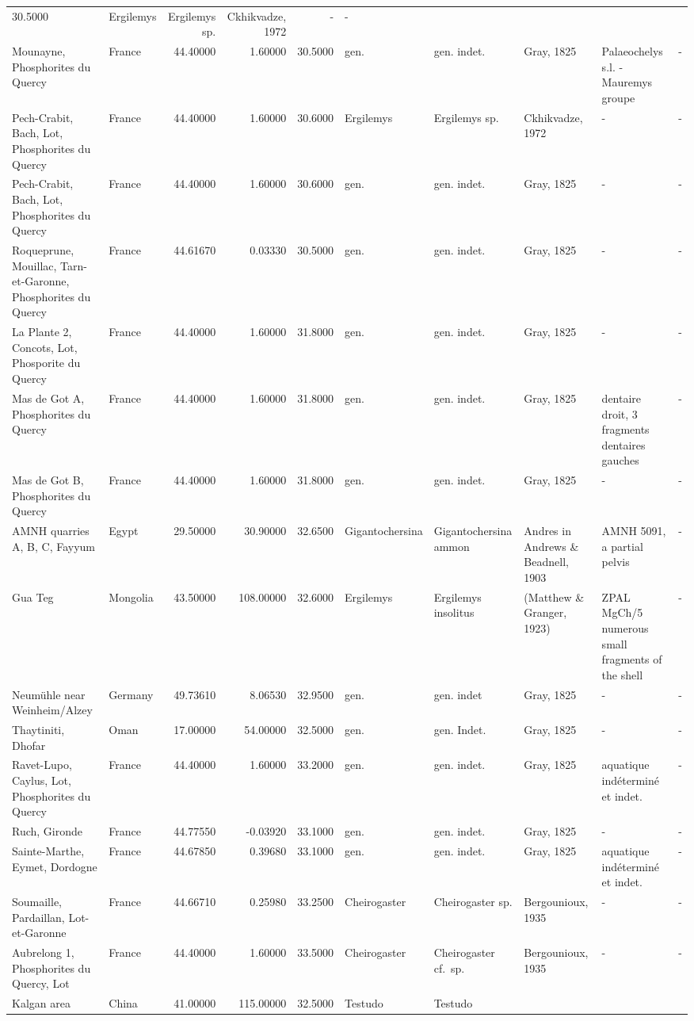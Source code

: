 \documentclass[]{article}
\begin{document}
\begin{longtable}[]{@{}llrrrlllll@{}}
30.5000 & Ergilemys & Ergilemys sp. & Ckhikvadze, 1972 & - &
-\tabularnewline
Mounayne, Phosphorites du Quercy & France & 44.40000 & 1.60000 & 30.5000
& gen. & gen. indet. & Gray, 1825 & Palaeochelys s.l. - Mauremys groupe
& -\tabularnewline
Pech-Crabit, Bach, Lot, Phosphorites du Quercy & France & 44.40000 &
1.60000 & 30.6000 & Ergilemys & Ergilemys sp. & Ckhikvadze, 1972 & - &
-\tabularnewline
Pech-Crabit, Bach, Lot, Phosphorites du Quercy & France & 44.40000 &
1.60000 & 30.6000 & gen. & gen. indet. & Gray, 1825 & - &
-\tabularnewline
Roqueprune, Mouillac, Tarn-et-Garonne, Phosphorites du Quercy & France &
44.61670 & 0.03330 & 30.5000 & gen. & gen. indet. & Gray, 1825 & - &
-\tabularnewline
La Plante 2, Concots, Lot, Phosporite du Quercy & France & 44.40000 &
1.60000 & 31.8000 & gen. & gen. indet. & Gray, 1825 & - &
-\tabularnewline
Mas de Got A, Phosphorites du Quercy & France & 44.40000 & 1.60000 &
31.8000 & gen. & gen. indet. & Gray, 1825 & dentaire droit, 3 fragments
dentaires gauches & -\tabularnewline
Mas de Got B, Phosphorites du Quercy & France & 44.40000 & 1.60000 &
31.8000 & gen. & gen. indet. & Gray, 1825 & - & -\tabularnewline
AMNH quarries A, B, C, Fayyum & Egypt & 29.50000 & 30.90000 & 32.6500 &
Gigantochersina & Gigantochersina ammon & Andres in Andrews \& Beadnell,
1903 & AMNH 5091, a partial pelvis & -\tabularnewline
Gua Teg & Mongolia & 43.50000 & 108.00000 & 32.6000 & Ergilemys &
Ergilemys insolitus & (Matthew \& Granger, 1923) & ZPAL MgCh/5 numerous
small fragments of the shell & -\tabularnewline
Neumühle near Weinheim/Alzey & Germany & 49.73610 & 8.06530 & 32.9500 &
gen. & gen. indet & Gray, 1825 & - & -\tabularnewline
Thaytiniti, Dhofar & Oman & 17.00000 & 54.00000 & 32.5000 & gen. & gen.
Indet. & Gray, 1825 & - & -\tabularnewline
Ravet-Lupo, Caylus, Lot, Phosphorites du Quercy & France & 44.40000 &
1.60000 & 33.2000 & gen. & gen. indet. & Gray, 1825 & aquatique
indéterminé et indet. & -\tabularnewline
Ruch, Gironde & France & 44.77550 & -0.03920 & 33.1000 & gen. & gen.
indet. & Gray, 1825 & - & -\tabularnewline
Sainte-Marthe, Eymet, Dordogne & France & 44.67850 & 0.39680 & 33.1000 &
gen. & gen. indet. & Gray, 1825 & aquatique indéterminé et indet. &
-\tabularnewline
Soumaille, Pardaillan, Lot-et-Garonne & France & 44.66710 & 0.25980 &
33.2500 & Cheirogaster & Cheirogaster sp. & Bergounioux, 1935 & - &
-\tabularnewline
Aubrelong 1, Phosphorites du Quercy, Lot & France & 44.40000 & 1.60000 &
33.5000 & Cheirogaster & Cheirogaster cf.~sp. & Bergounioux, 1935 & - &
-\tabularnewline
Kalgan area & China & 41.00000 & 115.00000 & 32.5000 & Testudo & Testudo

\end{longtable}
\end{document}
